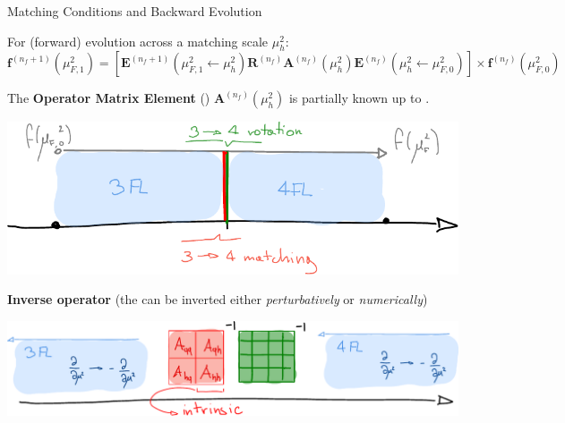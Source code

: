 \documentclass[9pt]{beamer}
\begin{document}
\begin{frame}{Matching Conditions and Backward Evolution}
    \vspace*{10pt}

    For (forward) evolution across a matching scale $\mu_h^2$:
    \begin{equation*} 
    \mathbf{f}^{(n_f+1)}(\mu_{F,1}^2) =
    \left[\mathbf{E}^{(n_f+1)}(\mu_{F,1}^2\leftarrow \mu_{h}^2)
            {\mathbf{R}^{(n_f)}}
            \mathbf{A}^{(n_f)}(\mu_{h}^2)
    \mathbf{E}^{(n_f)}(\mu_{h}^2\leftarrow \mu_{F,0}^2) \right]
            \times \mathbf{f}^{(n_f)}(\mu_{F,0}^2)
    \end{equation*}
    \vspace*{5pt}

    The \textbf{Operator Matrix Element} (\ome) $\mathbf{A}^{(n_f)}(\mu_{h}^2)$
    is partially known up to \alert{\textbf{\nnnlo}}.

    \begin{center}
        \includegraphics[scale=.7]{vfns-details}
    \end{center}
    \vspace*{5pt}

    \alert{\textbf{Inverse operator}} (the \ome can be inverted either
    \textit{perturbatively} or \textit{numerically})
    \begin{center}
        \includegraphics[scale=.7]{vfns-back-details}
    \end{center}
\end{frame}
\end{document}
